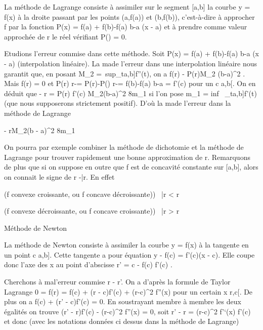 \documentclass[]{article}
\begin{document}
La méthode de Lagrange consiste à assimiler sur le segment {[}a,b{]} la
courbe y = f(x) à la droite passant par les points (a,f(a)) et (b,f(b)),
c'est-à-dire à approcher f par la fonction P(x) = f(a) + f(b)-f(a)
\over b-a (x - a) et à prendre comme valeur approchée
de r le réel \barr vérifiant
P(\barr) = 0.

Etudions l'erreur commise dans cette méthode. Soit P(x) = f(a) +
f(b)-f(a) \over b-a (x - a) (interpolation linéaire).
La ma\jmathoration de l'erreur dans une interpolation linéaire nous garantit
que, en posant M\_2 =\
sup\_t\in{[}a,b{]}\textbar{}f''(t)\textbar{}, on a \textbar{}f(r)
- P(r)\textbar{}\leq M\_2 (b-a)^2  . Mais f(r) = 0 et  P(r) \over
r-\barr = P(r)-P(\barr)
\over r-\barr = f(b)-f(a)
\over b-a = f'(c) pour un c \in{]}a,b{[}. On en déduit
que \textbar{}\barr - r\textbar{} =
\left \textbar{} P(r) \over f'(c)
\right \textbar{}\leq M\_2(b-a)^2
\over 8m\_1 si l'on pose m\_1
= inf~
\_t\in{[}a,b{]}\textbar{}f'(t)\textbar{} (que nous supposerons
strictement positif). D'où la ma\jmathoration de l'erreur dans la méthode de
Lagrange

\textbar{}\barr - r\textbar{}\leq M\_2(b -
a)^2 \over 8m\_1

On pourra par exemple combiner la méthode de dichotomie et la méthode de
Lagrange pour trouver rapidement une bonne approximation de r.
Remarquons de plus que si on suppose en outre que f est de concavité
constante sur {[}a,b{]}, alors on connait le signe de r
-\bar r. En effet

(f convexe croissante, ou f concave décroissante))
\rigtharrow~\bar r \textless{} r

(f convexe décroissante, ou f concave croissante))
\rigtharrow~\bar r \textgreater{} r

Méthode de Newton

La méthode de Newton consiste à assimiler la courbe y = f(x) à la
tangente en un point c \in {[}a,b{]}. Cette tangente a pour équation y -
f(c) = f'(c)(x - c). Elle coupe donc l'axe des x au point d'abscisse r'
= c - f(c) \over f'(c) .

Cherchons à ma\jmathorer l'erreur commise \textbar{}r - r'\textbar{}. On a
d'après la formule de Taylor Lagrange 0 = f(r) = f(c) + (r - c)f'(c) +
(r-c)^2 \over 2 f''(x) pour un certain x
\in{]}r,c{[}. De plus on a f(c) + (r' - c)f'(c) = 0. En soustrayant membre
à membre les deux égalités on trouve (r' - r)f'(c) -
(r-c)^2  f''(x) = 0, soit r' - r =
(r-c)^2 \over 2  f'`(x)
\over f'(c) et donc (avec les notations données ci
dessus dans la méthode de Lagrange)
\end{document}
